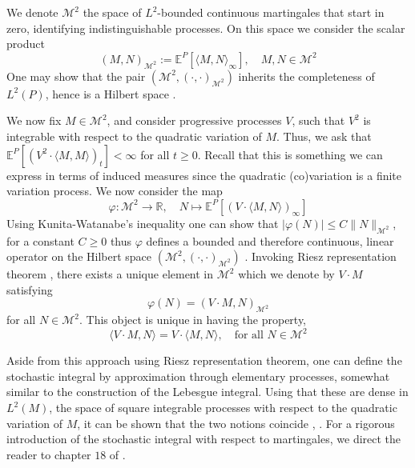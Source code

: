 We denote $\mathcal{M}^2$ the space of $L^2$-bounded continuous martingales that start in zero, identifying indistinguishable processes. On this space we consider the scalar product
\begin{equation*}
	(M, N)_{\mathcal{M}^2} := \mathbb{E}^P[ \langle M, N \rangle_{\infty}], \quad M, N \in \mathcal{M}^2
\end{equation*}
One may show that the pair $(\mathcal{M}^2, ( \cdot , \cdot )_{\mathcal{M}^2})$ inherits the completeness of $L^2(P)$, hence is a Hilbert space \cite[Lemma 18.4]{Kallenberg}.

We now fix $M \in \mathcal{M}^2$, and consider progressive processes $V$, such that $V^2$ is  integrable with respect to the quadratic variation of $M$. Thus, we ask that $\mathbb{E}^P[(V^2 \cdot \langle M, M \rangle)_t] < \infty$ for all $t \geq 0$. Recall that this is something we can express in terms of induced measures since the quadratic (co)variation is a finite variation process. We now consider the map
\begin{equation*}
	\varphi: \mathcal{M}^2 \rightarrow \mathbb{R}, \quad N \mapsto \mathbb{E}^P[ (V \cdot \langle M, N \rangle )_{\infty}]
\end{equation*}
Using Kunita-Watanabe's inequality one can show that $| \varphi(N) | \leq C \|N\|_{\mathcal{M}^2}$, for a constant $C \geq 0$ thus $\varphi$ defines a bounded and therefore continuous, linear operator on the Hilbert space $(\mathcal{M}^2, (\cdot, \cdot)_{\mathcal{M}^2})$ \cite[thm. 1.59]{PTSA}. Invoking Riesz representation theorem \cite[Lemma A3.6]{Kallenberg}, there exists a unique element in $\mathcal{M}^2$ which we denote by $V \cdot M$ satisfying
\begin{equation*}
	\varphi(N) = (V \cdot M, N)_{\mathcal{M}^2}
\end{equation*}
for all $N \in \mathcal{M}^2$. This object is unique in having the property,
\begin{equation}\label{definingpropertystochasticintegral}
	\langle V \cdot M, N \rangle = V \cdot \langle M, N \rangle, \quad \text{for all } N \in \mathcal{M}^2
\end{equation}

Aside from this approach using Riesz representation theorem, one can define the stochastic integral by approximation through elementary processes, somewhat similar to the construction of the Lebesgue integral. Using that these are dense in $L^2(M)$, the space of square integrable processes with respect to the quadratic variation of $M$, it can be shown that the two notions coincide \cite[p.35, 36]{PTSA}, \cite[thm. 18.22, 18.23]{Kallenberg}. For a rigorous introduction of the stochastic integral with respect to martingales, we direct the reader to chapter $18$ of \cite{Kallenberg}.

